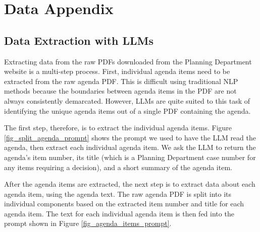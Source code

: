 \section{Data Appendix} \label{sec_data_appendix}

\subsection{Data Extraction with LLMs}

Extracting data from the raw PDFs downloaded from the Planning Department website is a multi-step process. First, individual agenda items need to be extracted from the raw agenda PDF. This is difficult using traditional NLP methods because the boundaries between agenda items in the PDF are not always consistently demarcated. However, LLMs are quite suited to this task of identifying the unique agenda items out of a single PDF containing the agenda.

The first step, therefore, is to extract the individual agenda items. Figure \ref{fig_split_agenda_prompt} shows the prompt we used to have the LLM read the agenda, then extract each individual agenda item. We ask the LLM to return the agenda's item number, its title (which is a Planning Department case number for any items requiring a decision), and a short summary of the agenda item.

After the agenda items are extracted, the next step is to extract data about each agenda item, using the agenda text. The raw agenda PDF is split into its individual components based on the extracted item number and title for each agenda item. The text for each individual agenda item is then fed into the prompt shown in Figure \ref{fig_agenda_items_prompt}. 

